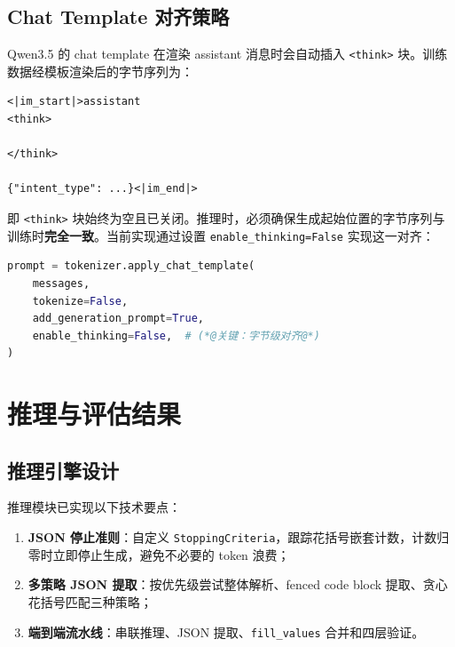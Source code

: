 \documentclass[12pt, a4paper]{article}
\newcommand{\fillvalues}{\texttt{fill\_values}}
\begin{document}
\subsection{Chat Template 对齐策略}
\label{sec:chat-template}

Qwen3.5 的 chat template 在渲染 assistant 消息时会自动插入 \texttt{<think>} 块。训练数据经模板渲染后的字节序列为：

\begin{lstlisting}[language={}, numbers=none]
<|im_start|>assistant
<think>

</think>

{"intent_type": ...}<|im_end|>
\end{lstlisting}

\noindent
即 \texttt{<think>} 块始终为空且已关闭。推理时，必须确保生成起始位置的字节序列与训练时\textbf{完全一致}。当前实现通过设置 \texttt{enable\_thinking=False} 实现这一对齐：

\begin{lstlisting}[language=Python, caption={推理时的 chat template 对齐}]
prompt = tokenizer.apply_chat_template(
    messages,
    tokenize=False,
    add_generation_prompt=True,
    enable_thinking=False,  # (*@关键：字节级对齐@*)
)
\end{lstlisting}

\section{推理与评估结果}
\label{sec:eval}

\subsection{推理引擎设计}

推理模块已实现以下技术要点：

\begin{enumerate}
  \item \textbf{JSON 停止准则}：自定义 \texttt{StoppingCriteria}，跟踪花括号嵌套计数，计数归零时立即停止生成，避免不必要的 token 浪费；
  \item \textbf{多策略 JSON 提取}：按优先级尝试整体解析、fenced code block 提取、贪心花括号匹配三种策略；
  \item \textbf{端到端流水线}：串联推理、JSON 提取、\fillvalues{} 合并和四层验证。
\end{enumerate}
\end{document}
